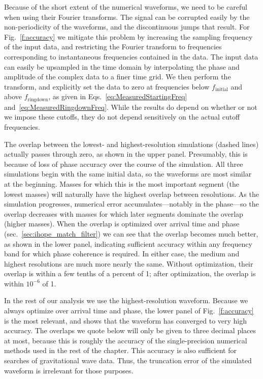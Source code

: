 Because of the short extent of the numerical waveforms, we need to be
careful when using their Fourier transforms.  The signal can be
corrupted easily by the non-periodicity of the waveforms, and the
discontinuous jumps that result.  For Fig.~\ref{f:accuracy} we
mitigate this problem by increasing the sampling frequency of the
input data, and restricting the Fourier transform to frequencies
corresponding to instantaneous frequencies contained in the data.  The
input data can easily be upsampled in the time domain by interpolating
the phase and amplitude of the complex data to a finer time grid.  We
then perform the transform, and explicitly set the data to zero at
frequencies below $f_{\mathrm{initial}}$ and above
$f_{\mathrm{ringdown}}$, as given in
Eqs.~\ref{eq:MeasuredStartingFreq} and~\ref{eq:MeasuredRingdownFreq}.
While the results do depend on whether or not we impose these cutoffs,
they do not depend sensitively on the actual cutoff frequencies.

The overlap between the lowest- and highest-resolution simulations
(dashed lines) actually passes through zero, as shown in the upper
panel.  Presumably, this is because of loss of phase accuracy over the
course of the simulation.  All three simulations begin with the same
initial data, so the waveforms are most similar at the beginning.
Masses for which this is the most important segment (the lowest
masses) will naturally have the highest overlap between resolutions.
As the simulation progresses, numerical error accumulates---notably in
the phase---so the overlap decreases with masses for which later
segments dominate the overlap (higher masses).  When the overlap is
optimized over arrival time and phase
(sec.~\ref{sec:ihope_match_filter}) we can see that the overlap
becomes much better, as shown in the lower panel, indicating
sufficient accuracy within any frequency band for which phase
coherence is required.  In either case, the medium and highest
resolutions are much more nearly the same.  Without optimization,
their overlap is within a few tenths of a percent of 1; after
optimization, the overlap is within $10^{-6}$ of 1.

In the rest of our analysis we use the highest-resolution waveform.
Because we always optimize over arrival time and phase, the lower
panel of Fig.~\ref{f:accuracy} is the most relevant, and shows that
the waveform has converged to very high accuracy.  The overlaps we
quote below will only be given to three decimal places at most,
because this is roughly the accuracy of the single-precision numerical
methods used in the rest of the chapter.  This accuracy is also
sufficient for searches of gravitational wave data.  Thus, the
truncation error of the simulated waveform is irrelevant for those
purposes.

